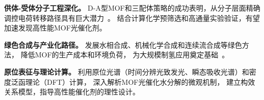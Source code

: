 \textbf{供体-受体分子工程深化。}
D-A型MOF和三配体策略的成功表明，从分子层面精确调控电荷转移路径具有巨大潜力~\citep{yan2023donor_acceptor_mof,liu2024three_ligand_timof}。 %
结合计算化学预筛选和高通量实验验证，有望加速发现高性能MOF光催化剂。

\textbf{绿色合成与产业化路径。}
发展水相合成、机械化学合成和连续流合成等绿色方法，
降低MOF的生产成本和环境负荷，
为大规模制氢应用奠定基础~\citep{jiang2026mof_review}。 %

\textbf{原位表征与理论计算。}
利用原位光谱（时间分辨光致发光、瞬态吸收光谱）和密度泛函理论（DFT）计算，
深入解析MOF光催化水分解的微观机制，
建立构效关系模型，指导高性能催化剂的理性设计。 %

